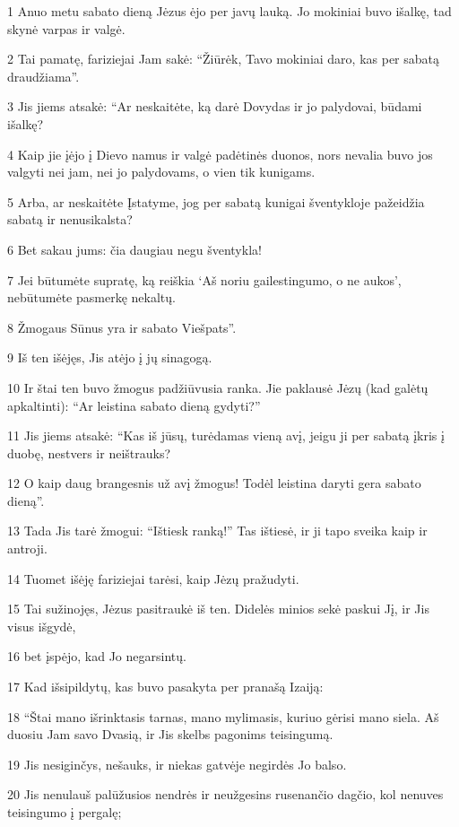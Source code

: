 \par 1 Anuo metu sabato dieną Jėzus ėjo per javų lauką. Jo mokiniai buvo išalkę, tad skynė varpas ir valgė. 
\par 2 Tai pamatę, fariziejai Jam sakė: “Žiūrėk, Tavo mokiniai daro, kas per sabatą draudžiama”. 
\par 3 Jis jiems atsakė: “Ar neskaitėte, ką darė Dovydas ir jo palydovai, būdami išalkę? 
\par 4 Kaip jie įėjo į Dievo namus ir valgė padėtinės duonos, nors nevalia buvo jos valgyti nei jam, nei jo palydovams, o vien tik kunigams. 
\par 5 Arba, ar neskaitėte Įstatyme, jog per sabatą kunigai šventykloje pažeidžia sabatą ir nenusikalsta? 
\par 6 Bet sakau jums: čia daugiau negu šventykla! 
\par 7 Jei būtumėte supratę, ką reiškia ‘Aš noriu gailestingumo, o ne aukos’, nebūtumėte pasmerkę nekaltų. 
\par 8 Žmogaus Sūnus yra ir sabato Viešpats”. 
\par 9 Iš ten išėjęs, Jis atėjo į jų sinagogą. 
\par 10 Ir štai ten buvo žmogus padžiūvusia ranka. Jie paklausė Jėzų (kad galėtų apkaltinti): “Ar leistina sabato dieną gydyti?” 
\par 11 Jis jiems atsakė: “Kas iš jūsų, turėdamas vieną avį, jeigu ji per sabatą įkris į duobę, nestvers ir neištrauks? 
\par 12 O kaip daug brangesnis už avį žmogus! Todėl leistina daryti gera sabato dieną”. 
\par 13 Tada Jis tarė žmogui: “Ištiesk ranką!” Tas ištiesė, ir ji tapo sveika kaip ir antroji. 
\par 14 Tuomet išėję fariziejai tarėsi, kaip Jėzų pražudyti. 
\par 15 Tai sužinojęs, Jėzus pasitraukė iš ten. Didelės minios sekė paskui Jį, ir Jis visus išgydė, 
\par 16 bet įspėjo, kad Jo negarsintų. 
\par 17 Kad išsipildytų, kas buvo pasakyta per pranašą Izaiją: 
\par 18 “Štai mano išrinktasis tarnas, mano mylimasis, kuriuo gėrisi mano siela. Aš duosiu Jam savo Dvasią, ir Jis skelbs pagonims teisingumą. 
\par 19 Jis nesiginčys, nešauks, ir niekas gatvėje negirdės Jo balso. 
\par 20 Jis nenulauš palūžusios nendrės ir neužgesins rusenančio dagčio, kol nenuves teisingumo į pergalę; 

